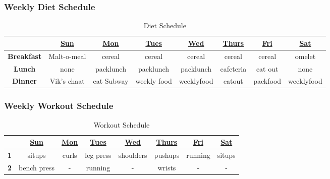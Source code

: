 \begin{frame}
\frametitle{Weekly Diet Schedule} 
\begin{table}[h!]
  \begin{center}
    \begin{tabular}{ | c | c c c c c c c |}
    \hline
       & \underline{Sun} & \underline{Mon} & \underline{Tues} & \underline{Wed} & \underline{Thurs} & \underline{Fri} & \underline{Sat} \\ 
    \hline
    \tiny \textbf{Breakfast}  &  \tiny Malt-o-meal  & \tiny cereal & \tiny cereal & \tiny cereal & \tiny cereal & \tiny cereal & \tiny omelet \\
     \tiny \textbf{Lunch} & \tiny none & \tiny packlunch  & \tiny packlunch  & \tiny packlunch  & \tiny cafeteria & \tiny eat out  & \tiny none \\ 
     \tiny \textbf{Dinner} & \tiny Vik's chaat & \tiny eat Subway  & \tiny weekly food & \tiny weeklyfood & \tiny eatout & \tiny packfood & \tiny weeklyfood \\ 
    \hline
    \end{tabular}
  \end{center}
  \caption{Diet Schedule}
\end{table}
\end{frame} 


\begin{frame}
\frametitle{Weekly Workout Schedule} 
\begin{table}[h!]
  \begin{center}
    \begin{tabular}{ | c | c c c c c c c |}
    \hline
       & \underline{Sun} & \underline{Mon} & \underline{Tues} & \underline{Wed} & \underline{Thurs} & \underline{Fri} & \underline{Sat} \\ 
    \hline
    \tiny \textbf{1}  &  \tiny situps  & \tiny curls & \tiny leg press & \tiny shoulders & \tiny pushups & \tiny running & \tiny situps \\
     \tiny \textbf{2} & \tiny bench press & \tiny -  & \tiny running  & \tiny - & \tiny wrists & \tiny -  & \tiny - \\ 
    \hline
    \end{tabular}
  \end{center}
  \caption{Workout Schedule}
\end{table}
\end{frame} 




